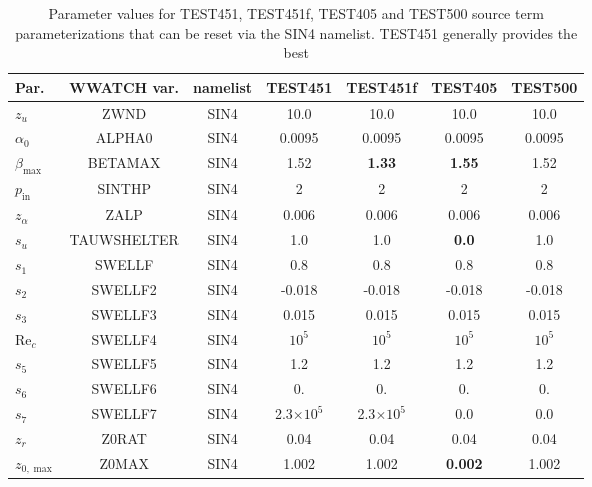 \begin{landscape}
\begin{table} \begin{center}
\begin{tabular}{|l|c|c|c|c|c|c|} \hline \hline
Par.         &  WWATCH var.       & namelist & TEST451 & TEST451f & TEST405  & TEST500 \\
\hline
  $z_u$ &  ZWND                       & SIN4 & 10.0    & 10.0    & 10.0      & 10.0 \\
  $\alpha_0$ &  ALPHA0                & SIN4 & 0.0095  & 0.0095   & 0.0095    &  0.0095 \\
  $\beta_{\mathrm{max}}$ & BETAMAX    & SIN4 & 1.52    &\textbf{1.33}& \textbf{1.55}    &  1.52   \\
  $p_{\mathrm{in}}$ &  SINTHP         & SIN4 & 2       & 2       & 2         &  2      \\
  $z_\alpha$ &  ZALP                  & SIN4 & 0.006   & 0.006   & 0.006     &  0.006 \\
  $s_u$ &  TAUWSHELTER                & SIN4 & 1.0     & 1.0     & \textbf{0.0} & 1.0   \\
  $s_1$ &  SWELLF                     & SIN4 & 0.8     & 0.8     & 0.8       &  0.8 \\
  $s_2$ &  SWELLF2                    & SIN4 & -0.018  & -0.018  & -0.018    &  -0.018 \\
  $s_3$ &  SWELLF3                    & SIN4 &  0.015  &  0.015  &  0.015    &  0.015 \\
  $\mathrm{Re}_c$ &  SWELLF4                    & SIN4 & $10^5$  & $10^5$  & $10^5$    & $10^5$  \\
  $s_5$ &  SWELLF5                    & SIN4 & 1.2     & 1.2     & 1.2       &  1.2 \\
  $s_6$ &  SWELLF6                    & SIN4 & 0.      & 0.      & 0.        & 0.   \\
  $s_7$ &  SWELLF7                    & SIN4 & 2.3$\times 10^5$ & 2.3$\times 10^5$  & 0.0       &  0.0 \\
  $z_r$ &  Z0RAT                      & SIN4 & 0.04    & 0.04    & 0.04      &  0.04 \\
  $z_{0,\max}$ &  Z0MAX               & SIN4 & 1.002   & 1.002   &\textbf{0.002}&  1.002 \\
\hline
\end{tabular}
 \end{center}
\caption{Parameter values for TEST451, TEST451f, TEST405 and TEST500 source term
parameterizations that can be reset via the SIN4 namelist. TEST451 generally provides the best 
}
\end{table}
\end{landscape}
